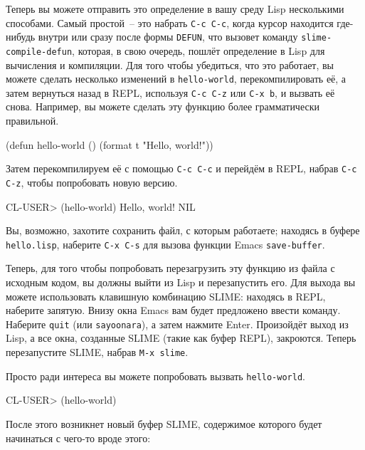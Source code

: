 Теперь вы можете отправить это определение в вашу среду Lisp несколькими способами. Самый
простой~-- это набрать \texttt{C-c C-c}, когда курсор находится где-нибудь внутри или сразу после
формы \lstinline{DEFUN}, что вызовет команду \texttt{slime-compile-defun}, которая, в свою очередь, пошлёт
определение в Lisp для вычисления и компиляции. Для того чтобы убедиться, что это
работает, вы можете сделать несколько изменений в \lstinline{hello-world}, перекомпилировать её, а
затем вернуться назад в REPL, используя \texttt{C-c C-z} или \texttt{C-x b}, и вызвать её снова. Например,
вы можете сделать эту функцию более грамматически правильной.

\begin{myverb}
(defun hello-world ()
  (format t "Hello, world!"))
\end{myverb}

Затем перекомпилируем её с помощью \texttt{C-c C-c} и перейдём в REPL, набрав \texttt{C-c C-z}, чтобы
попробовать новую версию.

\begin{myverb}
CL-USER> (hello-world)
Hello, world!
NIL
\end{myverb}

Вы, возможно, захотите сохранить файл, с которым работаете; находясь в буфере
\texttt{hello.lisp}, наберите \texttt{C-x C-s} для вызова функции Emacs \texttt{save-buffer}.

Теперь, для того чтобы попробовать перезагрузить эту функцию из файла с исходным кодом,
вы должны выйти из Lisp и перезапустить его. Для выхода вы можете использовать клавишную
комбинацию SLIME: находясь в REPL, наберите запятую. Внизу окна Emacs вам будет предложено
ввести команду. Наберите \texttt{quit} (или \texttt{sayoonara}), а затем нажмите Enter. Произойдёт выход из
Lisp, а все окна, созданные SLIME (такие как буфер REPL), закроются. Теперь перезапустите
SLIME, набрав \texttt{M-x slime}.

Просто ради интереса вы можете попробовать вызвать \lstinline{hello-world}.

\begin{myverb}
CL-USER> (hello-world)
\end{myverb}

После этого возникнет новый буфер SLIME, содержимое которого будет начинаться с чего-то
вроде этого:

